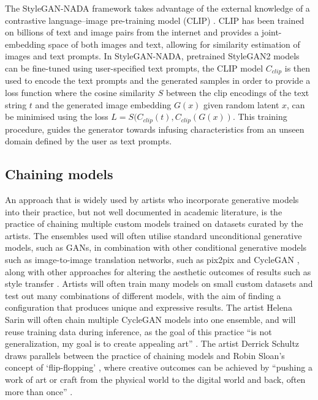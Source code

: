 The StyleGAN-NADA framework \citep{gal2021stylegan} takes advantage of the external knowledge of a contrastive language–image pre-training model (CLIP) \citep{radford2021learning}. 
CLIP has been trained on billions of text and image pairs from the internet and provides a joint-embedding space of both images and text, allowing for similarity estimation of images and text prompts. 
In StyleGAN-NADA, pretrained StyleGAN2 models \citep{karras2019analyzing} can be fine-tuned using user-specified text prompts, the CLIP model $C_{clip}$ is then used to encode the text prompts and the generated samples in order to provide a loss function where the cosine similarity $S$ between the clip encodings of the text string $t$ and the generated image embedding $G(x)$ given random latent $x$, can be minimised using the loss $L = S(C_{clip}(t), C_{clip}(G(x))$. 
This training procedure, guides the generator towards infusing characteristics from an unseen domain defined by the user as text prompts.

\subsection{Chaining models}
\label{survey:chaining}

An approach that is widely used by artists who incorporate generative models into their practice, but not well documented in academic literature, is the practice of chaining multiple custom models trained on datasets curated by the artists. 
The ensembles used will often utilise standard unconditional generative models, such as GANs, in combination with other conditional generative models such as image-to-image translation networks, such as pix2pix \citep{isola2017image} and CycleGAN \citep{zhu2017unpaired}, along with other approaches for altering the aesthetic outcomes of results such as style transfer \citep{gatys2016neural}. 
Artists will often train many models on small custom datasets and test out many combinations of different models, with the aim of finding a configuration that produces unique and expressive results. 
The artist Helena Sarin will often chain multiple CycleGAN models into one ensemble, and will reuse training data during inference, as the goal of this practice ``is not generalization, my goal is to create appealing art'' \citep{sarin2018playing}. 
The artist Derrick Schultz draws parallels between the practice of chaining models and Robin Sloan's concept of `flip-flopping' \citep{schultz2021personal}, where creative outcomes can be achieved by ``pushing a work of art or craft from the physical world to the digital world and back, often more than once'' \citep{sloan2012flipflop}.


